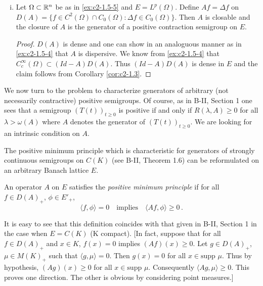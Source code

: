 \begin{examples}
\begin{enumerate}[(i)]
\item \label{ex:c2-1.5_6}   
Let $\Omega \subset \mathbb{R}^{n}$ be as in \ref{ex:c2-1.5-5}   and $E = L^{p}(\Omega)$.
Define $Af = \Delta f$ on $D(A) = \{f \in C^{2}(\Omega) \cap C_{0}(\Omega) \colon \Delta f \in C_{0}(\Omega)\}$.
Then $A$ is closable and the closure of $A$ is the generator of a positive contraction semigroup on $E$.
\begin{proof}
$D(A)$ is dense and one can show in an analoguous manner as in \ref{ex:c2-1.5-4}   that $A$ is dispersive.
We know from \ref{ex:c2-1.5-4}   that $C_{c}^{\infty}(\Omega) \subset (Id - A)D(A)$.
Thus $(Id - A)D(A)$ is dense in $E$ and the claim follows from Corollary \ref{cor:c2-1.3}.
\end{proof}
\end{enumerate}
\end{examples}

We now turn to the problem to characterize generators of arbitrary (not necessarily contractive) positive semigroups.
Of course, as in B-II, Section 1 
one sees that a semigroup $(T(t))_{t \geq 0}$ is positive if and only if $R(\lambda,A) \geq 0$ for all $\lambda > \omega(A)$ where $A$ denotes the generator of $(T(t))_{t \geq 0}$.
We are looking for an intrinsic condition on $A$.

The positive minimum principle which is characteristic for generators of strongly continuous semigroups on $C(K)$ (see 
B-II, Theorem 1.6) can be reformulated on an arbitrary Banach lattice $E$.

\begin{definition}\label{def:c2-1.6}
An operator $A$ on $E$ satisfies the \emph{positive minimum principle} if for all $f \in D(A)_{+}$, $\phi \in E'_{+}$,
\begin{equation}\label{eq:c2-P} \tag{P}
\langle f,\phi \rangle = 0 \quad \text{implies} \quad \langle Af,\phi \rangle \geq 0 \,.
\end{equation}
\end{definition}

\begin{remark*}\label{rem:c2-1.6}
It is easy to see that this definition coincides with that given in B-II, Section 1 
in the case when $E = C(K)$ (K compact).
[In fact, suppose that for all $f \in D(A)_{+}$ and $x \in K$, $f(x) = 0$ implies $(Af)(x) \geq 0$.
Let $g \in D(A)_{+}$, $\mu \in M(K)_{+}$ such that $\langle g,\mu \rangle = 0$.
Then $g(x) = 0$ for all $x \in \text{supp } \mu$.
Thus by hypothesis, $(Ag)(x) \geq 0$ for all $x \in \text{supp } \mu$.
Consequently $\langle Ag,\mu \rangle \geq 0$.
This proves one direction.
The other is obvious by considering point measures.]
\end{remark*}

